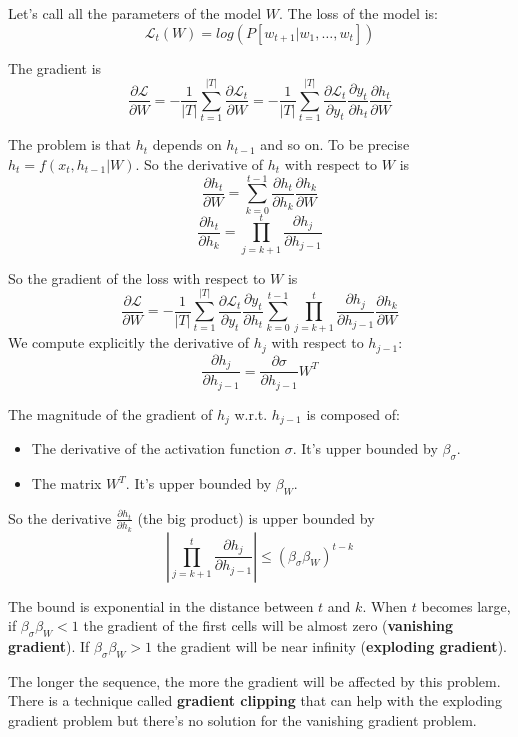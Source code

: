 Let's call all the parameters of the model $W$.
The loss of the model is:
\[
    \mathcal{L}_t(W)=log(P[w_{t+1}|w_1,\dots,w_t])
\]

The gradient is
\[
    \frac{\partial \mathcal{L}}{\partial W}
    =-\frac{1}{|T|}\sum_{t=1}^{|T|}\frac{\partial \mathcal{L}_t}{\partial W}
    =-\frac{1}{|T|}\sum_{t=1}^{|T|}\frac{\partial \mathcal{L}_t}{\partial y_t}\frac{\partial y_t}{\partial h_t}\frac{\partial h_t}{\partial W}
\]

The problem is that $h_t$ depends on $h_{t-1}$ and so on.
To be precise $h_t=f(x_t,h_{t-1}|W)$.
So the derivative of $h_t$ with respect to $W$ is
\[
    \frac{\partial h_t}{\partial W}=\sum_{k=0}^{t-1}\frac{\partial h_t}{\partial h_k}\frac{\partial h_k}{\partial W}
\]
\[
    \frac{\partial h_t}{\partial h_k}=\prod_{j=k+1}^t\frac{\partial h_j}{\partial h_{j-1}}
\]

So the gradient of the loss with respect to $W$ is
\[
    \frac{\partial \mathcal{L}}{\partial W}
    =-\frac{1}{|T|}\sum_{t=1}^{|T|}\frac{\partial \mathcal{L}_t}{\partial y_t}\frac{\partial y_t}{\partial h_t}\sum_{k=0}^{t-1}\prod_{j=k+1}^t\frac{\partial h_j}{\partial h_{j-1}}\frac{\partial h_k}{\partial W}
\]
We compute explicitly the derivative of $h_j$ with respect to $h_{j-1}$:
\[
    \frac{\partial h_j}{\partial h_{j-1}}=\frac{\partial\sigma}{\partial h_{j-1}}W^T
\]

The magnitude of the gradient of $h_j$ w.r.t. $h_{j-1}$ is composed of:
\begin{itemize}
    \item The derivative of the activation function $\sigma$.
    It's upper bounded by $\beta_\sigma$.
    \item The matrix $W^T$. It's upper bounded by $\beta_W$.
\end{itemize}

So the derivative $\frac{\partial h_t}{\partial h_k}$ (the big product) is upper bounded by
\[
    \left|\prod_{j=k+1}^t\frac{\partial h_j}{\partial h_{j-1}}\right| \leq \left(\beta_\sigma\beta_W\right)^{t-k}
\]

The bound is exponential in the distance between $t$ and $k$.
When $t$ becomes large, if $\beta_\sigma\beta_W<1$ the gradient of the 
first cells will be almost zero (\textbf{vanishing gradient}).
If $\beta_\sigma\beta_W>1$ the gradient will be near infinity (\textbf{exploding gradient}).

The longer the sequence, the more the gradient will be affected by this problem.
There is a technique called \textbf{gradient clipping} that can help with the exploding gradient problem
but there's no solution for the vanishing gradient problem.

